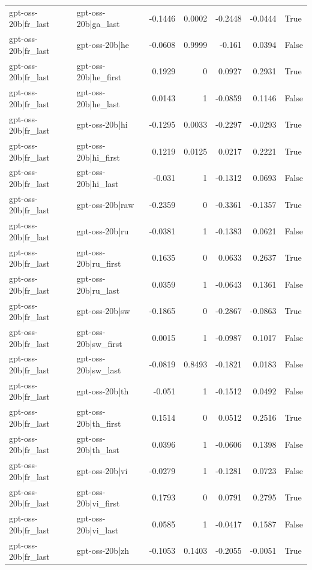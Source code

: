\begin{table}
\begin{tabular}{l l r r r r l}
gpt-oss-20b|fr_last & gpt-oss-20b|ga_last & -0.1446 & 0.0002 & -0.2448 & -0.0444 & True \\
gpt-oss-20b|fr_last & gpt-oss-20b|he & -0.0608 & 0.9999 & -0.161 & 0.0394 & False \\
gpt-oss-20b|fr_last & gpt-oss-20b|he_first & 0.1929 & 0 & 0.0927 & 0.2931 & True \\
gpt-oss-20b|fr_last & gpt-oss-20b|he_last & 0.0143 & 1 & -0.0859 & 0.1146 & False \\
gpt-oss-20b|fr_last & gpt-oss-20b|hi & -0.1295 & 0.0033 & -0.2297 & -0.0293 & True \\
gpt-oss-20b|fr_last & gpt-oss-20b|hi_first & 0.1219 & 0.0125 & 0.0217 & 0.2221 & True \\
gpt-oss-20b|fr_last & gpt-oss-20b|hi_last & -0.031 & 1 & -0.1312 & 0.0693 & False \\
gpt-oss-20b|fr_last & gpt-oss-20b|raw & -0.2359 & 0 & -0.3361 & -0.1357 & True \\
gpt-oss-20b|fr_last & gpt-oss-20b|ru & -0.0381 & 1 & -0.1383 & 0.0621 & False \\
gpt-oss-20b|fr_last & gpt-oss-20b|ru_first & 0.1635 & 0 & 0.0633 & 0.2637 & True \\
gpt-oss-20b|fr_last & gpt-oss-20b|ru_last & 0.0359 & 1 & -0.0643 & 0.1361 & False \\
gpt-oss-20b|fr_last & gpt-oss-20b|sw & -0.1865 & 0 & -0.2867 & -0.0863 & True \\
gpt-oss-20b|fr_last & gpt-oss-20b|sw_first & 0.0015 & 1 & -0.0987 & 0.1017 & False \\
gpt-oss-20b|fr_last & gpt-oss-20b|sw_last & -0.0819 & 0.8493 & -0.1821 & 0.0183 & False \\
gpt-oss-20b|fr_last & gpt-oss-20b|th & -0.051 & 1 & -0.1512 & 0.0492 & False \\
gpt-oss-20b|fr_last & gpt-oss-20b|th_first & 0.1514 & 0 & 0.0512 & 0.2516 & True \\
gpt-oss-20b|fr_last & gpt-oss-20b|th_last & 0.0396 & 1 & -0.0606 & 0.1398 & False \\
gpt-oss-20b|fr_last & gpt-oss-20b|vi & -0.0279 & 1 & -0.1281 & 0.0723 & False \\
gpt-oss-20b|fr_last & gpt-oss-20b|vi_first & 0.1793 & 0 & 0.0791 & 0.2795 & True \\
gpt-oss-20b|fr_last & gpt-oss-20b|vi_last & 0.0585 & 1 & -0.0417 & 0.1587 & False \\
gpt-oss-20b|fr_last & gpt-oss-20b|zh & -0.1053 & 0.1403 & -0.2055 & -0.0051 & True \\

\end{tabular}
\end{table}
